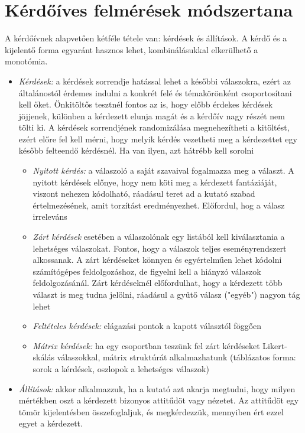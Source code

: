 \chapter{Kérdőíves felmérések módszertana}

A kérdőívnek alapvetően kétféle tétele van: kérdések és állítások. A kérdő és a kijelentő forma egyaránt hasznos lehet, kombinálásukkal elkerülhető a monotómia.
\begin{itemize}
\item \emph{Kérdések:} a kérdések sorrendje hatással lehet a későbbi válaszokra, ezért az általánostól érdemes indulni a konkrét felé és témakörönként csoportosítani kell őket. Önkitöltős tesztnél fontos az is, hogy előbb érdekes kérdések jöjjenek, különben a kérdezett elunja magát és a kérdőív nagy részét nem tölti ki. A kérdések sorrendjének randomizálása megnehezítheti a kitöltést, ezért előre fel kell mérni, hogy melyik kérdés vezetheti meg a kérdezettet egy később felteendő kérdésnél. Ha van ilyen, azt hátrébb kell sorolni
	\begin{itemize}
	\item \emph{Nyitott kérdés:} a válaszoló a saját szavaival fogalmazza meg a választ. A nyitott kérdések előnye, hogy nem köti meg a kérdezett fantáziáját, viszont nehezen kódolható, ráadásul teret ad a kutató szabad értelmezésének, amit torzítást eredményezhet. Előfordul, hog a válasz irreleváns
	\item \emph{Zárt kérdések} esetében a válaszolónak egy listából kell kiválasztania a lehetséges válaszokat. Fontos, hogy a válaszok teljes eseményrendszert alkossanak. A zárt kérdéseket könnyen és egyértelműen lehet kódolni számítógépes feldolgozáshoz, de figyelni kell a hiányzó válaszok feldolgozásánál. Zárt kérdéseknél előfordulhat, hogy a kérdezett több választ is meg tudna jelölni, ráadásul a gyűtő válasz ("egyéb") nagyon tág lehet
	\item \emph{Feltételes kérdések:} elágazási pontok a kapott választól föggően
	\item \emph{Mátrix kérdések:} ha egy csoportban teszünk fel zárt kérdéseket Likert-skálás válaszokkal, mátrix struktúrát alkalmazhatunk (táblázatos forma: sorok a kérdések, oszlopok a lehetséges válaszok)
	\end{itemize}
\item \emph{Állítások:} akkor alkalmazzuk, ha a kutató azt akarja megtudni, hogy milyen mértékben oszt a kérdezett bizonyos attitűdöt vagy nézetet. Az attitűdöt egy tömör kijelentésben összefoglaljuk, és megkérdezzük, mennyiben ért ezzel egyet a kérdezett.
\end{itemize}

